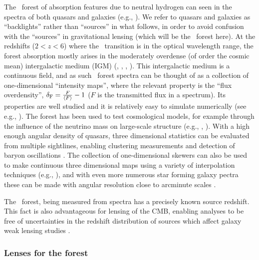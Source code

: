 The \lya\ forest of absorption features due to neutral hydrogen can
seen in the spectra of both quasars \cite{rauch1998} and galaxies (e.g.,
\cite{savaglio2002}).  We refer to quasars and galaxies as
``backlights'' rather than ``sources'' in what follows, in order to
avoid confusion with the ``sources'' in gravitational lensing (which
will be the \lya\ forest here). At the redshifts ($2 < z
< 6$) where the \lya\ transition is in the optical wavelength
range, the forest absorption mostly arises in the moderately overdense
(of order the cosmic mean) intergalactic medium (IGM) (\cite{bi1993}, 
\cite{cen1994}, \cite{zhang1995}, \cite{hernquist1996}).
  This intergalactic medium is a continuous field, and as such
\lya\ forest spectra can be thought of as a collection of
one-dimensional ``intensity maps'',
where the relevant property is the ``flux overdensity'', $\delta_{\rm F}=\frac{F}{\langle F \rangle} -1$ ($F$
is the transmitted flux in a spectrum).  Its properties are well
studied and it is relatively easy to simulate numerically (see e.g.,
\cite{bolton2017}). The forest has been used to test
cosmological models, for example through the influence of the neutrino
mass on large-scale structure (e.g., \cite{pal2015}, \cite{croft1999}).
  With a high enough angular
density of quasars, three dimensional statistics can be evaluated
from  multiple sightlines, enabling clustering
measurements and detection of baryon
oscillations \citep{busca2013}. The
collection of one-dimensional skewers can also be used to make
continuous three dimensional maps using a variety of interpolation
techniques (e.g., \cite{cisewski}), and
with even more numerous star forming galaxy pectra
these can be made with angular resolution close to arcminute scales
\citep{Lee2014}.

The \lya\ forest, being measured from spectra has a precisely known
source redshift. This fact is also advantageous for lensing of the
CMB, enabling analyses to be free of uncertainties in the redshift
distribution of sources which affect galaxy weak lensing studies
\citep{hearin2010}.

\subsubsection{Lenses for the forest}

